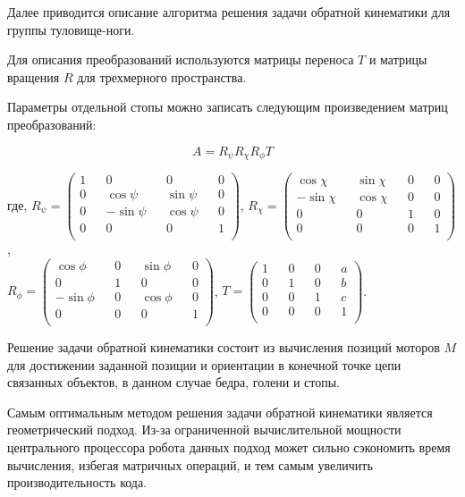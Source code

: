 Далее приводится описание алгоритма решения задачи обратной кинематики для группы туловище-ноги. 

Для описания преобразований используются матрицы переноса $T$ и матрицы вращения $R$ для трехмерного пространства.

Параметры отдельной стопы можно записать следующим произведением матриц преобразований:

\begin{equation}
A = R_{\psi} R_{\chi} R_{\phi} T
\end{equation}

\noindent где,
$ R_{\psi} = \begin{pmatrix}
1 && 0 && 0 && 0 \\
0 && \cos \psi &&  \sin \psi && 0 \\
0 && -\sin \psi && \cos \psi && 0 \\
0 && 0 && 0 && 1 \\
\end{pmatrix}$,
$ R_{\chi} = \begin{pmatrix}
\cos \chi &&  \sin \chi && 0 && 0 \\
-\sin \chi && \cos \chi && 0 && 0 \\
0 && 0 && 1 && 0 \\
0 && 0 && 0 && 1 \\
\end{pmatrix}$, \\
$ R_{\phi} = \begin{pmatrix}
\cos \phi &&  0 && \sin \phi && 0 \\
0 && 1 && 0 && 0 \\
-\sin \phi && 0 && \cos \phi && 0 \\
0 && 0 && 0 && 1 \\
\end{pmatrix}$,
$ T = \begin{pmatrix}
1 && 0 && 0 && a \\
0 && 1 && 0 && b \\
0 && 0 && 1 && c \\
0 && 0 && 0 && 1 \\
\end{pmatrix}$.

Решение задачи обратной кинематики состоит из вычисления позиций моторов $M$ для достижении заданной позиции и ориентации в конечной точке цепи связанных объектов, в данном случае бедра, голени и стопы.

Самым оптимальным методом решения задачи обратной кинематики является геометрический подход. Из-за ограниченной вычислительной мощности центрального процессора робота данных подход может сильно сэкономить время вычисления, избегая матричных операций, и тем самым увеличить производительность кода.


